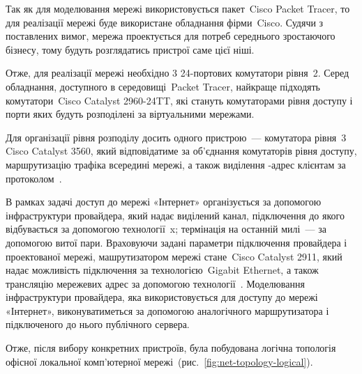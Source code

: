 \documentclass[
  ukrainian,
  simple,
]{eskdnaukvd}
\begin{document}
      Так як для моделювання мережі використовується пакет~\textenglish{Cisco Packet Tracer}, то для реалізації мережі буде використане обладнання фірми~\textenglish{Cisco}. Судячи з поставлених вимог, мережа проектується для потреб середнього зростаючого бізнесу, тому будуть розглядатись пристрої саме цієї ніші.

      Отже, для реалізації мережі необхідно 3 24-портових комутатори рівня~2. Серед обладнання, доступного в середовищі~\textenglish{Packet Tracer}, найкраще підходять комутатори~\textenglish{Cisco Catalyst 2960-24TT}, які стануть комутаторами рівня доступу і порти яких будуть розподілені за віртуальними мережами.

      Для організації рівня розподілу досить одного пристрою~— комутатора рівня~3 \textenglish{Cisco Catalyst 3560}, який відповідатиме за об'єднання комутаторів рівня доступу, маршрутизацію трафіка всередині мережі, а також виділення \textenglish{}-адрес клієнтам за протоколом~\textenglish{}.

      В рамках задачі доступ до мережі «Інтернет» організується за допомогою інфраструктури провайдера, який надає виділений канал, підключення до якого відбувається за допомогою технології~\textenglish{x}; термінація на останній милі~— за допомогою витої пари. Враховуючи задані параметри підключення провайдера і проектованої мережі, машрутизатором мережі стане~\textenglish{Cisco Catalyst 2911}, який надає можливість підключення за технологією~\textenglish{Gigabit Ethernet}, а також трансляцію мережевих адрес за допомогою технології~\textenglish{}. Моделювання інфраструктури провайдера, яка використовується для доступу до мережі «Інтернет», виконуватиметься за допомогою аналогічного маршрутизатора і підключеного до нього публічного сервера.

      Отже, після вибору конкретних пристроїв, була побудована логічна топологія офісної локальної комп'ютерної мережі~(рис.~\ref{fig:net-topology-logical}).
\end{document}
